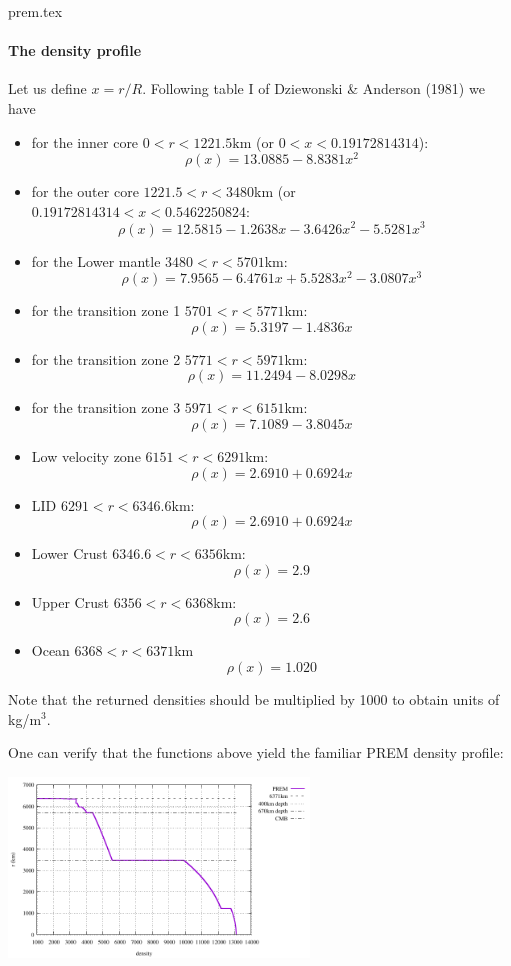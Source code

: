 \begin{flushright} {\tiny {\color{gray} prem.tex}} \end{flushright}

\paragraph{The density profile} Let us define $x=r/R$.
Following table I of Dziewonski \& Anderson (1981) \cite{dzan81} 
we have 

\begin{itemize}
\item for the inner core $0<r<1221.5\si{\km}$ (or $ 0<x<0.19172814314$):
\[
\rho(x) =13.0885-8.8381 x^2
\]
\item for the outer core $1221.5<r<3480$km (or  $ 0.19172814314  <x< 0.5462250824$:
\[
\rho(x)=12.5815-1.2638x-3.6426x^2-5.5281x^3
\]
\item for the Lower mantle $3480<r<5701$km:
\[
\rho(x)=7.9565-6.4761x+5.5283x^2-3.0807x^3
\]
\item for the transition zone 1 $5701<r<5771$km:
\[
\rho(x)=5.3197-1.4836x
\]
\item for the transition zone 2 $5771<r<5971$km:
\[
\rho(x)=11.2494-8.0298x
\]
\item for the transition zone 3 $5971<r<6151$km:
\[
\rho(x)=7.1089-3.8045x
\]
\item Low velocity zone $6151<r<6291$km:
\[
\rho(x)=2.6910+0.6924x
\]
\item LID  $6291<r<6346.6$km:
\[
\rho(x)=2.6910+0.6924x
\]
\item Lower Crust $6346.6<r<6356$km:
\[
\rho(x)=2.9
\]
\item Upper Crust $6356<r<6368$km:
\[
\rho(x)=2.6
\]
\item Ocean $6368<r<6371$km
\[
\rho(x)=1.020
\]
\end{itemize}

\noindent Note that the returned densities should be multiplied by 1000 to obtain 
units of kg/m$^3$.

One can verify that the functions above yield the familiar PREM density profile:
\begin{center}
\includegraphics[width=8cm]{images/prem/rho.pdf}
\end{center}


